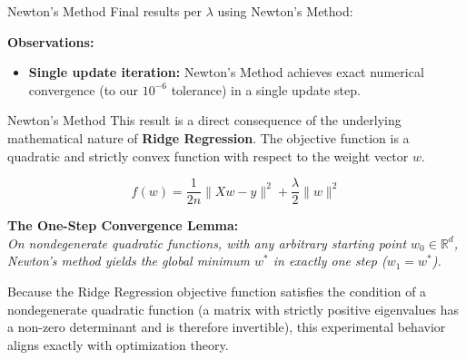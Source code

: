 \documentclass[10pt]{beamer}
\begin{document}
\begin{frame}{Newton's Method}
    \small
    Final results per $\lambda$ using Newton's Method:

    \vspace{0.4cm}
    \begin{table}[]
        \centering
    \end{table}

    \vspace{0.4cm}
    \textbf{Observations:}
    \begin{itemize}
        \item \textbf{Single update iteration:} Newton's Method achieves exact numerical convergence (to our $10^{-6}$ tolerance) in a single update step.
    \end{itemize}

\end{frame}

\begin{frame}{Newton's Method}
    \small
    This result is a direct consequence of the underlying mathematical nature of \textbf{Ridge Regression}. The objective function is a quadratic and strictly convex function with respect to the weight vector $w$. 

    $$f(w) = \frac{1}{2n} \| Xw - y \|^2 + \frac{\lambda}{2} \| w \|^2$$

    \vspace{0.3cm}
    \textbf{The One-Step Convergence Lemma:}\\
    \textit{On nondegenerate quadratic functions, with any arbitrary starting point $w_0 \in \mathbb{R}^d$, Newton's method yields the global minimum $w^*$ in exactly one step ($w_1 = w^*$).}

    \vspace{0.3cm}
    Because the Ridge Regression objective function satisfies the condition of a nondegenerate quadratic function (a matrix with strictly positive eigenvalues has a non-zero determinant and is therefore invertible), this experimental behavior aligns exactly with optimization theory.
\end{frame}
\end{document}
